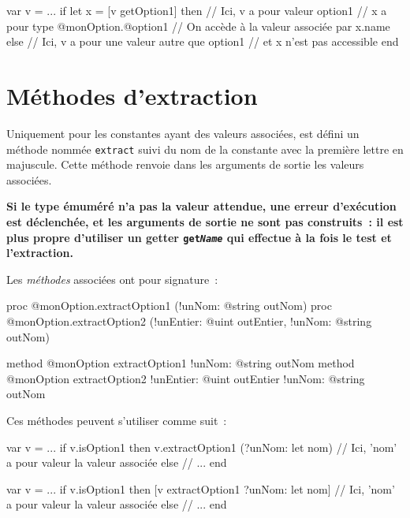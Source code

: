 \begin{galgas3}
var v = ...
if let x = [v getOption1] then
  // Ici, v a pour valeur option1
  // x a pour type @monOption.@option1
  // On accède à la valeur associée par x.name
else
  // Ici, v a pour une valeur autre que option1
  // et x n'est pas accessible
end
\end{galgas3}












\section{Méthodes d'extraction}

Uniquement pour les constantes ayant des valeurs associées, est défini un méthode nommée \texttt{extract} suivi du nom  de la constante avec la première lettre en majuscule. Cette méthode renvoie dans les arguments de sortie les valeurs associées.

{\bf Si le type émuméré n'a pas la valeur attendue, une erreur d'exécution est déclenchée, et les arguments de sortie ne sont pas construits~: il est plus propre d'utiliser un getter \texttt{get\emph{Name}} qui effectue à la fois le test et l'extraction.}


Les \emph{méthodes} associées ont pour signature~:
\begin{galgas4}
proc @monOption.extractOption1 (!unNom: @string outNom)
proc @monOption.extractOption2 (!unEntier: @uint outEntier, !unNom: @string outNom)
\end{galgas4}
\begin{galgas3}
method @monOption extractOption1 !unNom: @string outNom
method @monOption extractOption2 !unEntier: @uint outEntier !unNom: @string outNom
\end{galgas3}

Ces méthodes peuvent s'utiliser comme suit~:
\begin{galgas4}
var v = ...
if v.isOption1 then
  v.extractOption1 (?unNom: let nom) 
  // Ici, 'nom' a pour valeur la valeur associée
else
  // ...
end
\end{galgas4}

\begin{galgas3}
var v = ...
if v.isOption1 then
  [v extractOption1 ?unNom: let nom] 
  // Ici, 'nom' a pour valeur la valeur associée
else
  // ...
end
\end{galgas3}













